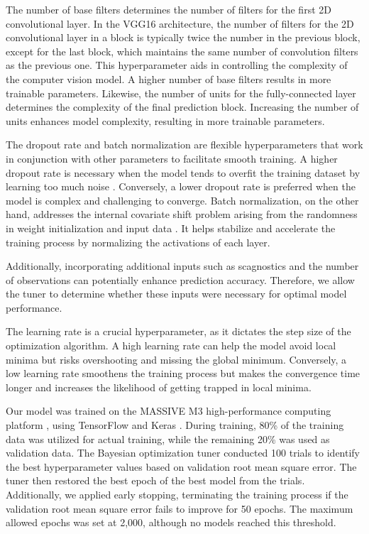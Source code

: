 \documentclass[]{interact}
\theoremstyle{plain}%
\theoremstyle{definition}
\theoremstyle{remark}
\begin{document}
The number of base filters determines the number of filters for the
first 2D convolutional layer. In the VGG16 architecture, the number of
filters for the 2D convolutional layer in a block is typically twice the
number in the previous block, except for the last block, which maintains
the same number of convolution filters as the previous one. This
hyperparameter aids in controlling the complexity of the computer vision
model. A higher number of base filters results in more trainable
parameters. Likewise, the number of units for the fully-connected layer
determines the complexity of the final prediction block. Increasing the
number of units enhances model complexity, resulting in more trainable
parameters.

The dropout rate and batch normalization are flexible hyperparameters
that work in conjunction with other parameters to facilitate smooth
training. A higher dropout rate is necessary when the model tends to
overfit the training dataset by learning too much noise
\citep{srivastava2014dropout}. Conversely, a lower dropout rate is
preferred when the model is complex and challenging to converge. Batch
normalization, on the other hand, addresses the internal covariate shift
problem arising from the randomness in weight initialization and input
data \citep{goodfellow2016deep}. It helps stabilize and accelerate the
training process by normalizing the activations of each layer.

Additionally, incorporating additional inputs such as scagnostics and
the number of observations can potentially enhance prediction accuracy.
Therefore, we allow the tuner to determine whether these inputs were
necessary for optimal model performance.

The learning rate is a crucial hyperparameter, as it dictates the step
size of the optimization algorithm. A high learning rate can help the
model avoid local minima but risks overshooting and missing the global
minimum. Conversely, a low learning rate smoothens the training process
but makes the convergence time longer and increases the likelihood of
getting trapped in local minima.

Our model was trained on the MASSIVE M3 high-performance computing
platform \citep{goscinski2014multi}, using TensorFlow
\citep{abadi2016tensorflow} and Keras \citep{chollet2015keras}. During
training, 80\% of the training data was utilized for actual training,
while the remaining 20\% was used as validation data. The Bayesian
optimization tuner conducted 100 trials to identify the best
hyperparameter values based on validation root mean square error. The
tuner then restored the best epoch of the best model from the trials.
Additionally, we applied early stopping, terminating the training
process if the validation root mean square error fails to improve for 50
epochs. The maximum allowed epochs was set at 2,000, although no models
reached this threshold.
\end{document}
